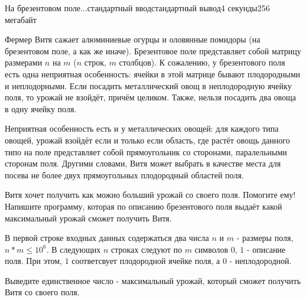\begin{problem}{На брезентовом поле...}{стандартный ввод}{стандартный вывод}{4 секунды}{256 мегабайт}

Фермер Витя сажает алюминиевые огурцы и оловянные помидоры (на брезентовом поле, а как же иначе). Брезентовое поле представляет собой матрицу размерами $n$ на $m$ ($n$ строк, $m$ столбцов). К сожалению, у брезентового поля есть одна неприятная особенность: ячейки в этой матрице бывают плодородными и неплодорными. Если посадить металлический овощ в неплодородную ячейку поля, то урожай не взойдёт, причём целиком. Также, нельзя посадить два овоща в одну ячейку поля.

Неприятная особенность есть и у металлических овощей: для каждого типа овощей, урожай взойдёт если и только если область, где растёт овощь данного типо на поле представляет собой прямоугольник со сторонами, паралельными сторонам поля. Другими словами, Витя может выбрать в качестве места для посева не более двух прямоугольных плодородный областей поля.

Витя хочет получить как можно больший урожай со своего поля. Помогите ему! Напишите программу, которая по описанию брезентового поля выдаёт какой максимальный урожай сможет получить Витя.

\InputFile
В первой строке входных данных содержаться два числа $n$ и $m$ - размеры поля, $n * m \le 10 ^ 6$.
В следующих $n$ строках следуют по $m$ символов $0$, $1$ - описание поля. При этом, $1$ соответсвует плодородной ячейке поля, а $0$ - неплодородной.

\OutputFile
Выведите единственное число - максимальный урожай, который сможет получить Витя со своего поля.

\Example

\begin{example}
%
\end{example}

\end{problem}

